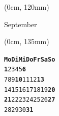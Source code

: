 \documentclass[a5paper]{article}
\newcommand{\weekdays}[1]{\textbf{#1}}
\newcommand{\sunday}[1]{\textcolor{sunday}{\textbf{#1}}}
\newcommand{\holiday}[1]{\textcolor{holiday}{\textbf{#1}}}
\begin{document}
\begin{textblock*}{\paperwidth} (0cm, 120mm)
    \begin{center}
        \Huge{}September
    \end{center}
\end{textblock*}

\begin{textblock*}{\paperwidth} (0cm, 135mm)
    \begin{center}
        \begin{varwidth}{\linewidth}
            \begin{alltt}
\LARGE
\weekdays{Mo Di Mi Do Fr Sa So}
    \holiday{1}  2  3  4  5  \sunday{6}
 7  8  9 \holiday{10} 11 12 \sunday{13}
14 15 16 17 18 19 \sunday{20}
\holiday{21} 22 23 24 25 26 \sunday{27}
28 29 30 \holiday{31}         
            \end{alltt}
        \end{varwidth}
    \end{center}
\end{textblock*}

\hfill
\newpage
\end{document}
